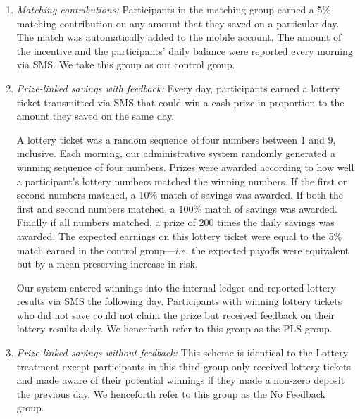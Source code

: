 \documentclass[11pt]{article}
\begin{document}
		\begin{enumerate} \setlength{\itemsep}{1pt}

			\item \textit{Matching contributions:} Participants in the matching group earned a 5\% matching contribution on any amount that they saved on a particular day. The match was automatically added to the mobile account. The amount of the incentive and the participants' daily balance were reported every morning via SMS. We take this group as our control group.

			\item \textit{Prize-linked savings with feedback:} Every day, participants earned a lottery ticket transmitted via SMS that could win a cash prize in proportion to the amount they saved on the same day.

			A lottery ticket was a random sequence of four numbers between 1 and 9, inclusive. Each morning, our administrative system randomly generated a winning sequence of four numbers. Prizes were awarded according to how well a participant's lottery numbers matched the winning numbers. If the first or second numbers matched, a 10\% match of savings was awarded. If both the first and second numbers matched, a 100\% match of savings was awarded. Finally if all numbers matched, a prize of 200 times the daily savings was awarded. The expected earnings on this lottery ticket were equal to the 5\% match earned in the control group---\textit{i.e.} the expected payoffs were equivalent but by a mean-preserving increase in risk.

			Our system entered winnings into the internal ledger and reported lottery results via SMS the following day. Participants with winning lottery tickets who did not save could not claim the prize but received feedback on their lottery results daily. We henceforth refer to this group as the PLS group. 

			\item \textit{Prize-linked savings without feedback:} This scheme is identical to the Lottery treatment except participants in this third group only received lottery tickets and made aware of their potential winnings if they made a non-zero deposit the previous day. We henceforth refer to this group as the No Feedback group.

		\end{enumerate}

		

\end{document}
